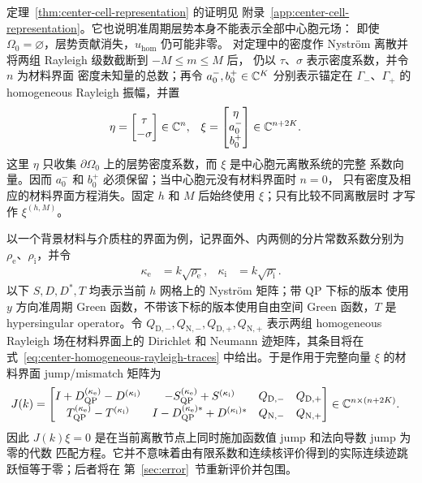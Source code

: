 定理~\ref{thm:center-cell-representation} 的证明见
附录~\ref{app:center-cell-representation}。它也说明准周期层势本身不能表示全部中心胞元场：
即使 $\Omega_0=\varnothing$，层势贡献消失，$u_{\mathrm{hom}}$ 仍可能非零。
对定理中的密度作 Nystr\"om 离散并将两组 Rayleigh 级数截断到 $-M\leq m\leq M$ 后，
仍以 $\tau$、$\sigma$ 表示密度系数，并令 $n$ 为材料界面
密度未知量的总数；再令 $a_0^-,b_0^+\in\mathbb{C}^K$ 分别表示锚定在
$\Gamma_-$、$\Gamma_+$ 的 homogeneous Rayleigh 振幅，并置
\begin{align}
  \eta&=
  \begin{bmatrix}\tau\\-\sigma\end{bmatrix}\in\mathbb{C}^n,
  &\xi&=
  \begin{bmatrix}\eta\\a_0^-\\b_0^+\end{bmatrix}
  \in\mathbb{C}^{n+2K}.
  \label{eq:center-discrete-unknown}
\end{align}
这里 $\eta$ 只收集 $\partial\Omega_0$ 上的层势密度系数，而 $\xi$ 是中心胞元离散系统的完整
系数向量。因而 $a_0^-$ 和 $b_0^+$ 必须保留；当中心胞元没有材料界面时 $n=0$，
只有密度及相应的材料界面方程消失。固定 $h$ 和 $M$ 后始终使用 $\xi$；只有比较不同离散层时
才写作 $\xi^{(h,M)}$。

以一个背景材料与介质柱的界面为例，记界面外、内两侧的分片常数系数分别为
$\rho_{\mathrm e}$、$\rho_{\mathrm i}$，并令
\begin{align}
  \kappa_{\mathrm e}&=k\sqrt{\rho_{\mathrm e}},
  &\kappa_{\mathrm i}&=k\sqrt{\rho_{\mathrm i}}.
  \label{eq:center-material-wavenumbers}
\end{align}
以下 $S,D,D^*,T$ 均表示当前 $h$ 网格上的 Nystr\"om 矩阵；带 $\mathrm{QP}$ 下标的版本
使用 $y$ 方向准周期 Green 函数，不带该下标的版本使用自由空间 Green 函数，$T$ 是
hypersingular operator。令 $Q_{\mathrm D,-},Q_{\mathrm N,-},Q_{\mathrm D,+},Q_{\mathrm N,+}$
表示两组 homogeneous Rayleigh 场在材料界面上的 Dirichlet 和 Neumann 迹矩阵，其条目将在
式~\eqref{eq:center-homogeneous-rayleigh-traces} 中给出。于是作用于完整向量 $\xi$ 的材料界面
jump/mismatch 矩阵为
\begin{align}
  J(k)
  &=
  \begin{bmatrix}
    I+D_{\mathrm{QP}}^{(\kappa_{\mathrm e})}
      -D^{(\kappa_{\mathrm i})}
    &-S_{\mathrm{QP}}^{(\kappa_{\mathrm e})}
      +S^{(\kappa_{\mathrm i})}
    &Q_{\mathrm D,-}&Q_{\mathrm D,+}\\
    T_{\mathrm{QP}}^{(\kappa_{\mathrm e})}
      -T^{(\kappa_{\mathrm i})}
    &I-D_{\mathrm{QP}}^{(\kappa_{\mathrm e})*}
      +D^{(\kappa_{\mathrm i})*}
    &Q_{\mathrm N,-}&Q_{\mathrm N,+}
  \end{bmatrix}
  \in\mathbb{C}^{n\times(n+2K)}.
  \label{eq:center-interface-jump-matrix}
\end{align}
因此 $J(k)\xi=0$ 是在当前离散节点上同时施加函数值 jump 和法向导数 jump 为零的代数
匹配方程。它并不意味着由有限系数和连续核评价得到的实际连续迹跳跃恒等于零；后者将在
第~\ref{sec:error}~节重新评价并包围。

